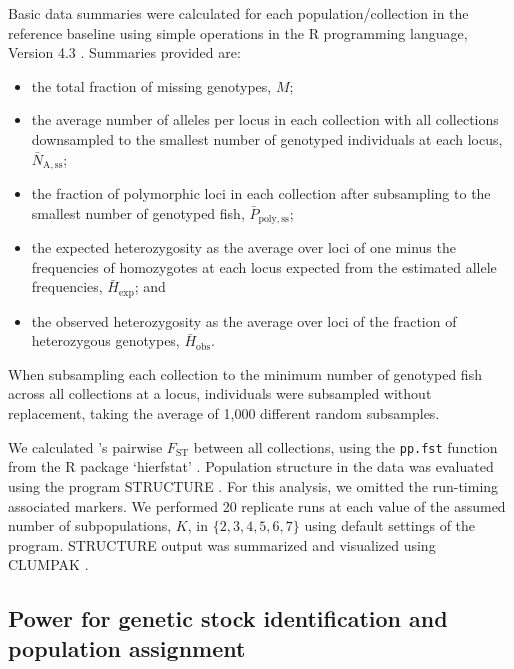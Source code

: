 Basic data summaries were calculated for each population/collection
in the reference baseline
using simple operations in the R programming language, Version 4.3
\citep{rcore}. Summaries provided are:
\begin {itemize}
\item the total fraction of missing genotypes, $M$;
\item the average number of alleles per locus in each collection with all collections
downsampled to the smallest number of genotyped individuals at each
locus, $\bar{N}_\mathrm{A,ss}$;
\item the fraction of polymorphic
loci in each collection after subsampling to the smallest number of genotyped
fish, $\bar{P}_\mathrm{poly,ss}$;
\item the expected heterozygosity as the average over loci
of one minus the frequencies of homozygotes at each locus expected from the
estimated allele frequencies, $\bar{H}_\mathrm{exp}$; and
\item the observed heterozygosity as the average over
loci of the fraction of heterozygous genotypes, $\bar{H}_\mathrm{obs}$.
\end{itemize}
When subsampling each collection to the minimum number of genotyped
fish across all collections at a locus, individuals were subsampled without
replacement, taking the average of 1,000 different random subsamples.

We calculated \citet{weir1984estimating}'s pairwise $F_\mathrm{ST}$ between
all collections, using the {\footnotesize\tt pp.fst} function from the R
package `hierfstat' \citep{hierfstat}. Population
structure in the data was evaluated
using the program STRUCTURE \citep{pritchard2000inference,falush2003inference}.
For this analysis, we omitted the run-timing associated markers.
We performed 20 replicate runs at each value of the assumed number of
subpopulations, $K$, in $\{2, 3, 4, 5, 6, 7\}$
using default settings of the program.  STRUCTURE output was
summarized and visualized using CLUMPAK
\citep{kopelman2015clumpak}.






\subsection*{Power for genetic stock identification and population assignment}

